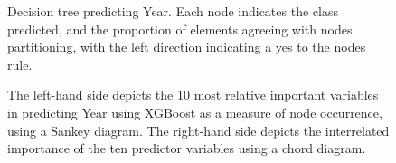 \documentclass[review,12pt,authoryear]{elsarticle}
\begin{document}
\begin{linenumbers}
 \begin{figure}
  \caption{Decision tree predicting Year. Each node indicates the class predicted, and the proportion of elements agreeing with nodes partitioning, with the left direction indicating a yes to the nodes rule.}\label{fig:year_tree}
 \end{figure}
 
 \begin{figure}
  \caption{The left-hand side depicts the 10 most relative important variables in predicting Year using XGBoost as a measure of node occurrence, using a Sankey diagram. The right-hand side depicts the interrelated importance of the ten predictor variables using a chord diagram.}\label{fig:year_sankey}
 \end{figure}


\end{linenumbers}
\end{document}

